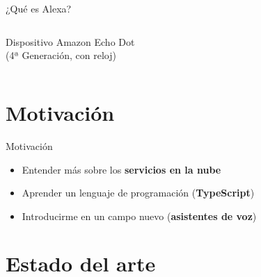 \documentclass{beamer}
\begin{document}
\begin{frame}{¿Qué es Alexa?}
\begin{columns}[c]
\begin{column}{.49\textwidth}
        \centering \vspace{0.5em}
        
        {\footnotesize
        Dispositivo Amazon Echo Dot\\
        (4ª Generación, con reloj)}
      \end{column}
    \end{columns}
  \end{frame}

  \section{Motivación}
  
  \newcommand{\includecenteredgraphicsb}[3][.35]{\raisebox{-#1\height}{\texttt{[image: \#3]}}}
  \newcommand{\includecenteredgraphicsl}[3][.35]{\includecenteredgraphicsb[#1]{#2}{#3}\hspace{.1em}}
  \newcommand{\includecenteredgraphicsr}[3][.35]{\hspace{.1em}\includecenteredgraphicsb[#1]{#2}{#3}}
 
  \begin{frame}{Motivación}
    \begin{itemize}
      \setlength\itemsep{1.5em}
      \item Entender más sobre los \textbf{servicios en la nube}
      \includecenteredgraphicsr{.35}{aws-lambda-logo.png}
      \item Aprender un lenguaje de programación (\textbf{TypeScript})
      \includecenteredgraphicsr{.02}{typescript-logo.png}
      \item Introducirme en un campo nuevo (\textbf{asistentes de voz})
      \includecenteredgraphicsr{1}{amazon-alexa.png}
    \end{itemize}
  \end{frame}

  \section{Estado del arte}
\end{document}
